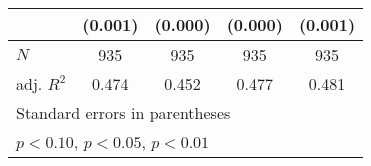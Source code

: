 {\begin{tabular}{l*{4}{c}}
            &     (0.001)         &     (0.000)         &     (0.000)         &     (0.001)         \\
\hline
\(N\)       &         935         &         935         &         935         &         935         \\
adj. \(R^{2}\)&       0.474         &       0.452         &       0.477         &       0.481         \\
\hline\hline
\multicolumn{5}{l}{\footnotesize Standard errors in parentheses}\\
\multicolumn{5}{l}{\footnotesize \sym{*} \(p<0.10\), \sym{**} \(p<0.05\), \sym{***} \(p<0.01\)}\\
\end{tabular}
}
